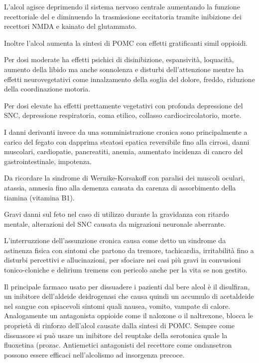 L'alcol agisce deprimendo il sistema nervoso centrale aumentando la funzione recettoriale del  e diminuendo la trasmissione eccitatoria tramite inibizione dei recettori NMDA e kainato del glutammato.

Inoltre l'alcol aumenta la sintesi di POMC con effetti gratificanti simil oppioidi.

Per dosi moderate ha effetti psichici di disinibizione, espansività, loquacità, aumento della libido ma anche sonnolenza e disturbi dell'attenzione mentre ha effetti neurovegetativi come innalzamento della soglia del dolore, freddo, riduzione della coordinazione motoria.

Per dosi elevate ha effetti prettamente vegetativi con profonda depressione del SNC, depressione respiratoria, coma etilico, collasso cardiocircolatorio, morte.

I danni derivanti invece da una somministrazione cronica sono principalmente a carico del fegato con dapprima steatosi epatica reversibile fino alla cirrosi, danni muscolari, cardiopatie, pancreatiti, anemia, aumentato incidenza di cancro del gastrointestinale, impotenza.

Da ricordare la sindrome di Wernike-Korsakoff con paralisi dei muscoli oculari, atassia, amnesia fino alla demenza causata da carenza di assorbimento della tiamina (vitamina B1).

Gravi danni sul feto nel caso di utilizzo durante la gravidanza con ritardo mentale, alterazioni del SNC causata da migrazioni neuronale aberrante.

L'interruzzione dell'assunzione cronica causa come detto un sindrome da astinenza fisica con sintomi che partono da tremore, tachicardia, irritabilità fino a disturbi percettivi e allucinazioni, per sfociare nei casi più gravi in convusioni tonico-cloniche e delirium tremens con pericolo anche per la vita se non gestito.

Il principale farmaco usato per dissuadere i pazienti dal bere alcol è il disulfiran, un inibitore dell'aldeide deidrogenasi che causa quindi un accumulo di acetaldeide nel sangue con spiacevoli sintomi quali nausea, vomito, vampate di calore. Analogamente un antagonista oppioide come il naloxone o il naltrexone, blocca le proprietà di rinforzo dell'alcol causate dalla sintesi di POMC. Sempre come dissuasore si può usare un inibitore del reuptake della serotonica quale la fluoxetina (prozac. Antiemetici antagonisti del recettore  come ondansetron possono essere efficaci nell'alcolismo ad insorgenza precoce.

